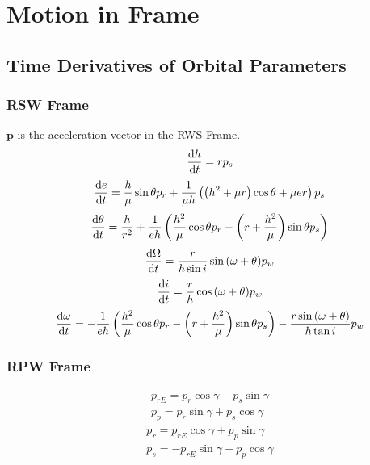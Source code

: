 \section{Motion in Frame}
\subsection{Time Derivatives of Orbital Parameters}
\subsubsection{RSW Frame}
$\mathbf{p}$ is the acceleration vector in the RWS Frame.
\begin{equation}
    \frac{\mathrm{d}h}{\mathrm{d}t} = rp_{s}
\end{equation}
\begin{equation}
    \frac{\mathrm{d}e}{\mathrm{d}t} =
        \frac{h}{\mu}\sin{\theta}p_{r}+
        \frac{1}{\mu{}h}\left(
            \left(h^{2}+\mu{}r\right)\cos{\theta}+\mu{}er
        \right)p_{s}
\end{equation}
\begin{equation}
    \frac{\mathrm{d}\theta}{\mathrm{d}t} =
        \frac{h}{r^{2}}+
        \frac{1}{eh}\left(
            \frac{h^{2}}{\mu}\cos{\theta}p_{r}-\left(r+\frac{h^2}{\mu}\right)\sin{\theta}p_{s}
        \right)
\end{equation}
\begin{equation}
    \frac{\mathrm{d}\Omega}{\mathrm{d}t} =
        \frac{r}{h\sin{i}}\sin{\left(\omega+\theta\right)}p_{w}
\end{equation}
\begin{equation}
    \frac{\mathrm{d}i}{\mathrm{d}t} =
        \frac{r}{h}\cos{\left(\omega+\theta\right)}p_{w}
\end{equation}
\begin{equation}
    \frac{\mathrm{d}\omega}{\mathrm{d}t} =
        -\frac{1}{eh}\left(\frac{h^{2}}{\mu}\cos{\theta}p_{r}-\left(r+\frac{h^{2}}{\mu}\right)\sin{\theta}p_{s}\right)
        -\frac{r\sin{\left(\omega+\theta\right)}}{h\tan{i}}p_{w}
\end{equation}

\subsubsection{RPW Frame}
\begin{equation}
    \begin{array}{c}
        p_{rE} = p_{r}\cos{\gamma} - p_{s}\sin{\gamma} \\
        p_{p}  = p_{r}\sin{\gamma} + p_{s}\cos{\gamma}
    \end{array}
\end{equation}
\begin{equation}
    \begin{array}{c}
        p_{r} =  p_{rE}\cos{\gamma} + p_{p}\sin{\gamma} \\
        p_{s} = -p_{rE}\sin{\gamma} + p_{p}\cos{\gamma}
    \end{array}
\end{equation}
